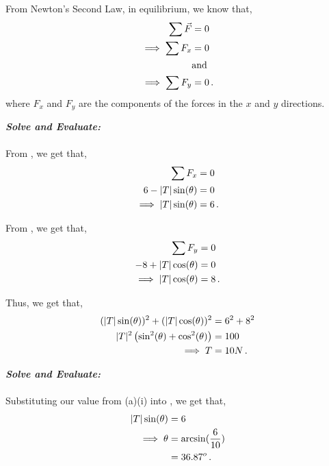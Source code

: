 \begin{subquestions}
\begin{subsubquestions}
From Newton's Second Law, in equilibrium, we know that,
\begin{align}
	\sum \vec{F} & = 0 \nonumber \\
	\implies \sum F_x & = 0 \label{2010:q6:ForceX} \\
	& \text{and} \nonumber \\
	\implies \sum F_y & = 0 \label{2010:q6:ForceY} \,.
\end{align}
where $F_x$ and $F_y$ are the components of the forces in the $x$ and $y$ directions.



\textbf{\textit{Solve and Evaluate:}} \\ \\
From , we get that,
\begin{align}
	\sum F_x & = 0 \nonumber \\
	6 -|T|\sin(\theta) & = 0 \nonumber \\
	\implies |T|\sin(\theta) & = 6 \label{2010:q6:TensEqn1} \,.
\end{align}

From , we get that,
\begin{align}
	\sum F_y & = 0 \nonumber \\
	-8 +|T|\cos(\theta) & = 0 \nonumber \\
	\implies |T|\cos(\theta) & = 8 \,.
\end{align}

Thus, we get that,
\begin{align}
	(|T|\sin(\theta))^2 + (|T|\cos(\theta))^2 & = 6^2 + 8^2 \nonumber \\
	|T|^2 \left(\sin^2(\theta)+\cos^2(\theta)\right) & = 100 \nonumber \\
	\implies T & = 10N \,.
\end{align}
	

\subsubquestion

\textbf{\textit{Solve and Evaluate:}} \\ \\
Substituting our value from (a)(i) into , we get that,
\begin{align}
	|T|\sin(\theta) & = 6 \nonumber \\
	\implies \theta & = \arcsin(\frac{6}{10}) \nonumber \\
	                & = 36.87^o \,.
\end{align}
	
\end{subsubquestions}


\end{subquestions}
